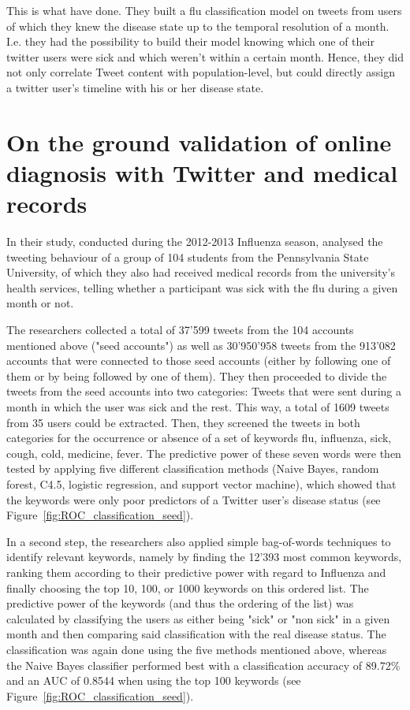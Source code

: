 \documentclass[11pt, a4paper]{report}\usepackage[]{graphicx}\usepackage[]{color}
\begin{document}
This is what \citep{bodnar_ground_2014} have done. They built a flu classification model on tweets from users of which they knew the disease state up to the temporal resolution of a month. I.e. they had the possibility to build their model knowing which one of their twitter users were sick and which weren't within a certain month. Hence, they did not only correlate Tweet content with population-level, but could directly assign a twitter user's timeline with his or her disease state.\newline

\section{On the ground validation of online diagnosis with Twitter and medical records}
In their study, conducted during the 2012-2013 Influenza season, \citep{bodnar_ground_2014} analysed the tweeting behaviour of a group of 104 students from the Pennsylvania State University, of which they also had received medical records from the university's health services, telling whether a participant was sick with the flu during a given month or not.\newline

The researchers collected a total of 37'599 tweets from the 104 accounts mentioned above ("seed accounts") as well as 30'950'958 tweets from the 913'082 accounts that were connected to those seed accounts (either by following one of them or by being followed by one of them). They then proceeded to divide the tweets from the seed accounts into two categories: Tweets that were sent during a month in which the user was sick and the rest. This way, a total of 1609 tweets from 35 users could be extracted. 
Then, they screened the tweets in both categories for the occurrence or absence of a set of keywords {flu, influenza, sick, cough, cold, medicine, fever}. The predictive power of these seven words were then tested by applying five different classification methods (Naive Bayes, random forest, C4.5, logistic regression, and support vector machine), which showed that the keywords were only poor predictors of a Twitter user's disease status (see Figure~\ref{fig:ROC_classification_seed}).

In a second step, the researchers also applied simple bag-of-words techniques to identify relevant keywords, namely by finding the 12'393 most common keywords, ranking them according to their predictive power with regard to Influenza and finally choosing the top 10, 100, or 1000 keywords on this ordered list. The predictive power of the keywords (and thus the ordering of the list) was calculated by classifying the users as either being "sick" or "non sick" in a given month and then comparing said classification with the real disease status. The classification was again done using the five methods mentioned above, whereas the Naive Bayes classifier performed best with a classification accuracy of 89.72\% and an AUC of 0.8544 when using the top 100 keywords (see Figure~\ref{fig:ROC_classification_seed}).
\end{document}
